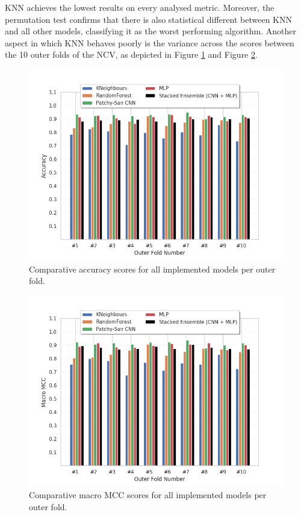 KNN achieves the lowest results on every analysed metric. Moreover, the permutation test confirms that there is also statistical different between KNN and all other models, classifying it as the worst performing algorithm. Another aspect in which KNN behaves poorly is the variance across the scores between the 10 outer folds of the NCV, as depicted in Figure \ref{acc_per_fold} and Figure \ref{macro_mcc_per_fold}. 

\begin{figure}[H]
  \centering
  \centerline{\includegraphics[scale=0.58]{Images/acc_per_fold_new_cols.png}}
  \caption{Comparative accuracy scores for all implemented models per outer fold.}
  \label{acc_per_fold}
\end{figure}

\begin{figure}[H]
  \centering
  \centerline{\includegraphics[scale=0.58]{Images/macro_mcc_per_fold_new_cols.png}}
  \caption{Comparative macro MCC scores for all implemented models per outer fold.}
  \label{macro_mcc_per_fold}
\end{figure}

